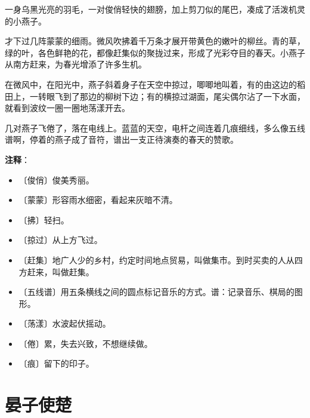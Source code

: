 \documentclass[12pt,UTF-8,openany]{ctexbook}
\begin{document}
\begin{Large}
    
    一身乌黑光亮的羽毛，一对俊俏轻快的翅膀，加上剪刀似的尾巴，凑成了活泼机灵的小燕子。
    
    才下过几阵蒙蒙的细雨。微风吹拂着千万条才展开带黄色的嫩叶的柳丝。青的草，绿的叶，各色鲜艳的花，都像赶集似的聚拢过来，形成了光彩夺目的春天。小燕子从南方赶来，为春光增添了许多生机。
    
    在微风中，在阳光中，燕子斜着身子在天空中掠过，唧唧地叫着，有的由这边的稻田上，一转眼飞到了那边的柳树下边；有的横掠过湖面，尾尖偶尔沾了一下水面，就看到波纹一圈一圈地荡漾开去。
    
    几对燕子飞倦了，落在电线上。蓝蓝的天空，电杆之间连着几痕细线，多么像五线谱啊，停着的燕子成了音符，谱出一支正待演奏的春天的赞歌。
    
\end{Large}


\newpage

\textbf{注释}：

\vspace{-1em}

\begin{itemize}
    \setlength\itemsep{-0.2em}
    \item 〔俊俏〕俊美秀丽。
    \item 〔蒙蒙〕形容雨水细密，看起来灰暗不清。
    \item 〔拂〕轻扫。
    \item 〔掠过〕从上方飞过。
    \item 〔赶集〕地广人少的乡村，约定时间地点贸易，叫做集市。到时买卖的人从四方赶来，叫做赶集。
    \item 〔五线谱〕用五条横线之间的圆点标记音乐的方式。谱：记录音乐、棋局的图形。
    \item 〔荡漾〕水波起伏摇动。
    \item 〔倦〕累，失去兴致，不想继续做。
    \item 〔痕〕留下的印子。
\end{itemize}

\chapter{晏子使楚}
\end{document}
